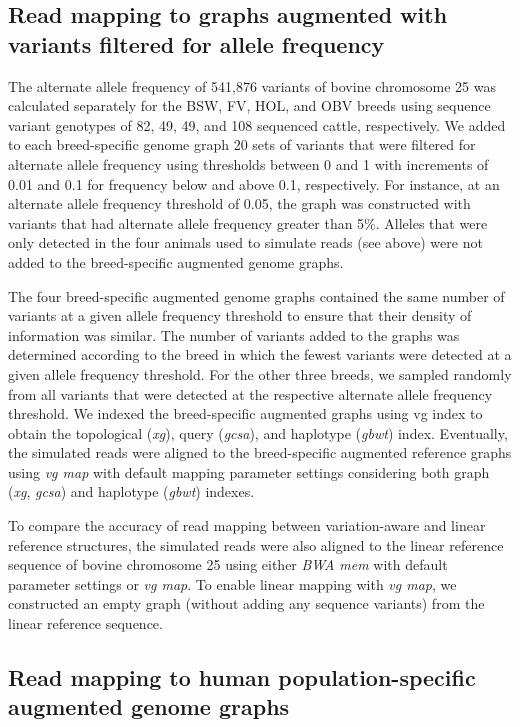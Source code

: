\documentclass[../main.tex]{subfiles}
\begin{document}
\subsection*{Read mapping to graphs augmented with variants filtered for allele frequency}

The alternate allele frequency of 541,876 variants of bovine chromosome 25 was calculated separately for the BSW, FV, HOL, and OBV breeds using sequence variant genotypes of 82, 49, 49, and 108 sequenced cattle, respectively. We added to each breed-specific genome graph 20 sets of variants that were filtered for alternate allele frequency using thresholds between 0 and 1 with increments of 0.01 and 0.1 for frequency below and above 0.1, respectively. For instance, at an alternate allele frequency threshold of 0.05, the graph was constructed with variants that had alternate allele frequency greater than 5\%. Alleles that were only detected in the four animals used to simulate reads (see above) were not added to the breed-specific augmented genome graphs.

The four breed-specific augmented genome graphs contained the same number of variants at a given allele frequency threshold to ensure that their density of information was similar. The number of variants added to the graphs was determined according to the breed in which the fewest variants were detected at a given allele frequency threshold. For the other three breeds, we sampled randomly from all variants that were detected at the respective alternate allele frequency threshold. We indexed the breed-specific augmented graphs using vg index to obtain the topological (\emph{xg}), query (\emph{gcsa}), and haplotype (\emph{gbwt}) index. Eventually, the simulated reads were aligned to the breed-specific augmented reference graphs using \emph{vg map} with default mapping parameter settings considering both graph (\emph{xg}, \emph{gcsa}) and haplotype (\emph{gbwt}) indexes.

To compare the accuracy of read mapping between variation-aware and linear reference structures, the simulated reads were also aligned to the linear reference sequence of bovine chromosome 25 using either \emph{BWA mem} with default parameter settings or \emph{vg map}. To enable linear mapping with \emph{vg map}, we constructed an empty graph (without adding any sequence variants) from the linear reference sequence.

\subsection*{Read mapping to human population-specific augmented genome graphs}
\end{document}

